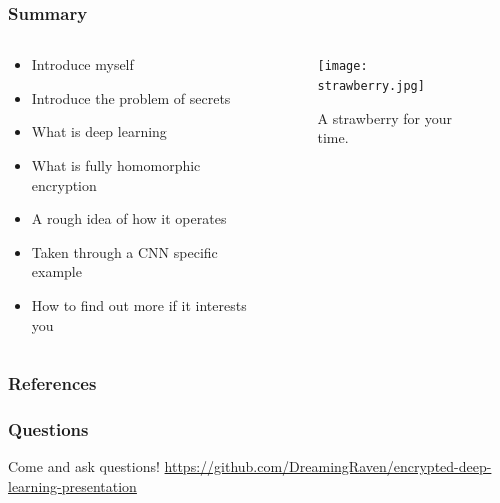 \documentclass[aspectratio=169]{beamer}
\begin{document}
  \begin{frame}
    \frametitle{Summary}
    \begin{columns}
      \begin{column}{0.5\textwidth}
        \begin{itemize}
          \item Introduce myself
          \item Introduce the problem of secrets
          \item What is deep learning
          \item What is fully homomorphic encryption
          \item A rough idea of how it operates
          \item Taken through a CNN specific example
          \item How to find out more if it interests you
        \end{itemize}
      \end{column}
      \begin{column}{0.5\textwidth}
        \begin{figure}[th!]
          \centering
          \texttt{[image: strawberry.jpg]}
          \caption{A strawberry for your time. \autocite{repository}}
          \label{fig:strawberry}
        \end{figure}
      \end{column}
    \end{columns}
  \end{frame}

  \begin{frame}[allowframebreaks]
    \frametitle{References}
    \printbibliography
  \end{frame}

  \begin{frame}
      \frametitle{Questions}
      Come and ask questions!
      \url{https://github.com/DreamingRaven/encrypted-deep-learning-presentation}
  \end{frame}
\end{document}
